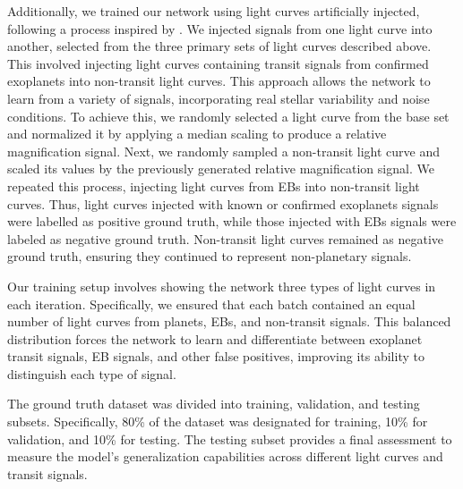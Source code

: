Additionally, we trained our network using light curves artificially injected, following a process inspired by \cite{olmschenk2021identifying}. We injected signals from one light curve into another, selected from the three primary sets of light curves described above. This involved injecting light curves containing transit signals from confirmed exoplanets into non-transit light curves. This approach allows the network to learn from a variety of signals, incorporating real stellar variability and noise conditions. To achieve this, we randomly selected a light curve from the base set and normalized it by applying a median scaling to produce a relative magnification signal. Next, we randomly sampled a non-transit light curve and scaled its values by the previously generated relative magnification signal. We repeated this process, injecting light curves from EBs into non-transit light curves. Thus, light curves injected with known or confirmed exoplanets signals were labelled as positive ground truth, while those injected with EBs signals were labeled as negative ground truth. Non-transit light curves remained as negative ground truth, ensuring they continued to represent non-planetary signals. \par



Our training setup involves showing the network three types of light curves in each iteration. Specifically, we ensured that each batch contained an equal number of light curves from planets, EBs, and non-transit signals. This balanced distribution forces the network to learn and differentiate between exoplanet transit signals, EB signals, and other false positives, improving its ability to distinguish each type of signal. \par

The ground truth dataset was divided into training, validation, and testing subsets. Specifically, 80\% of the dataset was designated for training, 10\% for validation, and 10\% for testing. The testing subset provides a final assessment to measure the model's generalization capabilities across different light curves and transit signals. \par




